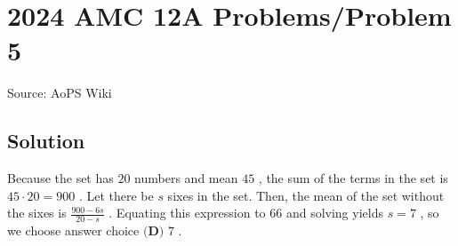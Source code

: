 \documentclass[12pt]{article}
\begin{document}
\section*{{2024 AMC 12A Problems/Problem 5}}
Source: AoPS Wiki

\subsection*{Solution}
Because the set has $20$ numbers and mean $45$ , the sum of the terms in the set is $45\cdot 20=900$ . Let there be $s$ sixes in the set. Then, the mean of the set without the sixes is $\frac{900-6s}{20-s}$ . Equating this expression to $66$ and solving yields $s=7$ , so we choose answer choice $\boxed{\textbf{(D) }7}$ .
\end{document}
